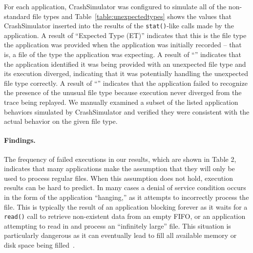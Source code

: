 For each application,
CrashSimulator was configured to simulate all of the non-standard file
types and
Table~\ref{table:unexpectedtypes} shows the values that CrashSimulator
inserted into the results of the {\tt stat()}-like calls made by the
application.
A result of ``Expected Type (ET)'' indicates
that this is the file type the application was provided
when the application was initially recorded -- that is,
a file of the type the application was expecting.
A result of ``\tickmark'' indicates that the application
identified it was being provided with an unexpected file type and its
execution diverged,
indicating that it was potentially handling the
unexpected file type correctly.
A result of ``\xmark'' indicates that the
application failed to recognize the presence of the unusual file type
because execution never diverged from the trace being replayed.
We manually examined a subset of the listed application behaviors simulated by
CrashSimulator and verified they were consistent with the actual behavior
on the given file type.

\paragraph{Findings.}
The frequency of failed executions in our results,
which are shown in Table 2,
indicates that many
applications make the assumption that they will only be used to process
regular files.  When this assumption does not hold, execution results
can be hard to predict.
In many cases a denial of
service condition occurs in the form of the application ``hanging,'' as it
attempts to incorrectly process the file.
This is typically the result of
an application blocking forever as it waits for a {\tt read()}
call to retrieve non-existent data from an empty FIFO,
or an application attempting
to read in and process an
``infinitely large'' file.
This situation is particularly dangerous as
it can eventually lead to
fill all available memory or disk space being filled~\cite{Cappos_CCS_08}.


